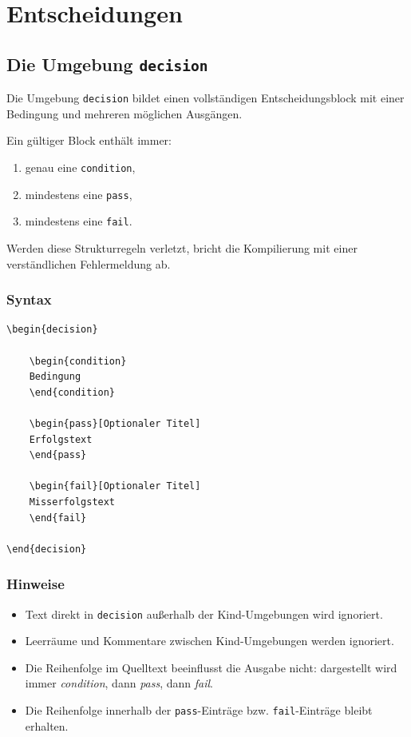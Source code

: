 \section{Entscheidungen}

\subsection{Die Umgebung \texttt{decision}}

Die Umgebung \verb|decision| bildet einen vollständigen Entscheidungsblock
mit einer Bedingung und mehreren möglichen Ausgängen.

Ein gültiger Block enthält immer:

\begin{enumerate}
\item genau eine \verb|condition|,
\item mindestens eine \verb|pass|,
\item mindestens eine \verb|fail|.
\end{enumerate}

Werden diese Strukturregeln verletzt, bricht die Kompilierung mit einer
verständlichen Fehlermeldung ab.

\subsubsection*{Syntax}

\begin{Verbatim}
\begin{decision}

    \begin{condition}
    Bedingung
    \end{condition}

    \begin{pass}[Optionaler Titel]
    Erfolgstext
    \end{pass}

    \begin{fail}[Optionaler Titel]
    Misserfolgstext
    \end{fail}

\end{decision}
\end{Verbatim}

\subsubsection*{Hinweise}

\begin{itemize}
\item Text direkt in \verb|decision| außerhalb der Kind-Umgebungen wird ignoriert.
\item Leerräume und Kommentare zwischen Kind-Umgebungen werden ignoriert.
\item Die Reihenfolge im Quelltext beeinflusst die Ausgabe nicht:
      dargestellt wird immer \emph{condition}, dann \emph{pass}, dann \emph{fail}.
\item Die Reihenfolge innerhalb der \verb|pass|-Einträge bzw. \verb|fail|-Einträge
      bleibt erhalten.
\end{itemize}

